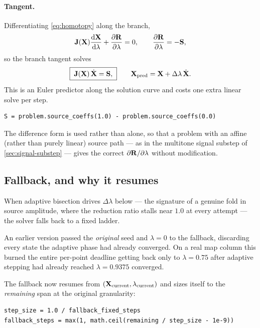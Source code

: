 \paragraph{Tangent.} Differentiating \eqref{eq:homotopy} along the branch,
\begin{equation}
  \mathbf{J}(\mathbf{X})\frac{\mathrm{d}\mathbf{X}}{\mathrm{d}\lambda}
  + \frac{\partial\mathbf{R}}{\partial\lambda} = 0,
  \qquad
  \frac{\partial\mathbf{R}}{\partial\lambda} = -\mathbf{S},
\end{equation}
so the branch tangent solves
\begin{equation}
  \boxed{\;\mathbf{J}(\mathbf{X})\,\dot{\mathbf{X}} = \mathbf{S},\;}
  \qquad
  \mathbf{X}_{\mathrm{pred}} = \mathbf{X} + \Delta\lambda\,\dot{\mathbf{X}}.
  \label{eq:tangent-predictor}
\end{equation}
This is an Euler predictor along the solution curve and costs one extra linear
solve per step.

\begin{implnote}
\begin{lstlisting}
S = problem.source_coeffs(1.0) - problem.source_coeffs(0.0)
\end{lstlisting}
The difference form is used rather than  alone, so
that a problem with an affine (rather than purely linear) source path --- as in
the multitone signal substep of \cref{sec:signal-substep} --- gives the correct
$\partial\mathbf{R}/\partial\lambda$ without modification.
\end{implnote}

\subsection{Fallback, and why it resumes}

When adaptive bisection drives $\Delta\lambda$ below  --- the
signature of a genuine fold in source amplitude, where the reduction ratio
stalls near $1.0$ at every attempt --- the solver falls back to a fixed ladder.

\begin{implnote}
An earlier version passed the \emph{original} seed and $\lambda=0$ to the
fallback, discarding every state the adaptive phase had already converged. On a
real map column this burned the entire per-point deadline getting back only to
$\lambda=0.75$ after adaptive stepping had already reached $\lambda=0.9375$
converged.

The fallback now resumes from $(\mathbf{X}_{\mathrm{current}},
\lambda_{\mathrm{current}})$ and sizes itself to the \emph{remaining} span at
the original granularity:
\begin{lstlisting}
step_size = 1.0 / fallback_fixed_steps
fallback_steps = max(1, math.ceil(remaining / step_size - 1e-9))
\end{lstlisting}
\end{implnote}

